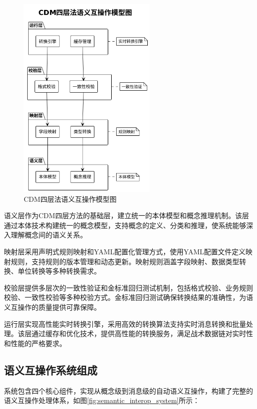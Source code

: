 \begin{figure}[H]
    \centering
    \includegraphics[width=0.6\textwidth,height=0.5\textheight]{chapters/fig-0/cdm_four_layer_simple.png}
    \caption{CDM四层法语义互操作模型图}
    \label{fig:cdm_four_layer}
\end{figure}

语义层作为CDM四层方法的基础层，建立统一的本体模型和概念推理机制。该层通过本体技术构建统一的概念模型，支持概念的定义、分类和推理，使系统能够深入理解概念间的语义关系。

映射层采用声明式规则映射和YAML配置化管理方式，使用YAML配置文件定义映射规则，支持规则的版本管理和动态更新。映射规则涵盖字段映射、数据类型转换、单位转换等多种转换需求。

校验层提供多层次的一致性验证和金标准回归测试机制，包括格式校验、业务规则校验、一致性校验等多种校验方式。金标准回归测试确保转换结果的准确性，为语义互操作的质量提供可靠保障。

运行层实现高性能实时转换引擎，采用高效的转换算法支持实时消息转换和批量处理。该层通过缓存和优化技术，提供高性能的转换服务，满足战术数据链对实时性和性能的严格要求。

\subsection{语义互操作系统组成}

系统包含四个核心组件，实现从概念级到消息级的自动语义互操作，构建了完整的语义互操作处理体系，如图\ref{fig:semantic_interop_system}所示：

